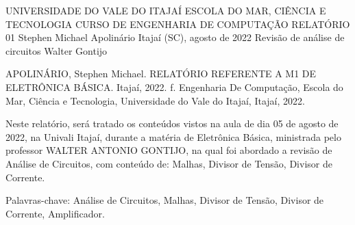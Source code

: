 
\begin{Info}
    {UNIVERSIDADE DO VALE DO ITAJAÍ}
    {ESCOLA DO MAR, CIÊNCIA E TECNOLOGIA}
    {CURSO DE ENGENHARIA DE COMPUTAÇÃO}
    {RELATÓRIO 01}
    {Stephen Michael Apolinário}
    {Itajaí (SC), agosto de 2022}
    {Revisão de análise de circuitos}
    {Walter Gontijo}
    {}
    \end{Info}
    
    
    
    
    \begin{Resumo}
    
    APOLINÁRIO, Stephen Michael. RELATÓRIO REFERENTE A M1 DE ELETRÔNICA BÁSICA. Itajaí, 2022. \pageref{LastPage} f. Engenharia De Computação, Escola do Mar, Ciência e Tecnologia, Universidade do Vale do Itajaí, Itajaí, 2022.
       
    Neste relatório, será tratado os conteúdos vistos na aula de dia 05 de agosto de 2022, na Univali Itajaí, durante a matéria de Eletrônica Básica, ministrada pelo professor WALTER ANTONIO GONTIJO, na qual foi abordado a revisão de Análise de Circuitos, com conteúdo de: Malhas, Divisor de Tensão, Divisor de Corrente.

    Palavras-chave:  Análise de Circuitos, Malhas, Divisor de Tensão, Divisor de Corrente, Amplificador.
    
    \end{Resumo}